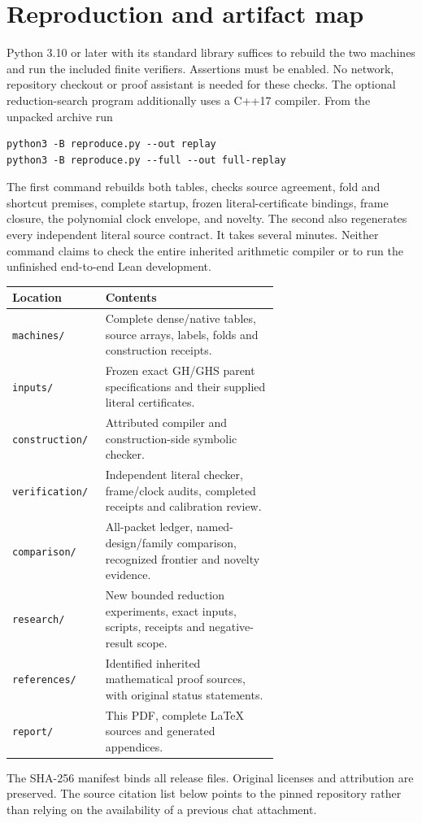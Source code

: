 \documentclass[11pt,letterpaper]{article}
\newcommand{\file}[1]{\nolinkurl{#1}}
\begin{document}
\section{Reproduction and artifact map}
Python 3.10 or later with its standard library suffices to rebuild the two
machines and run the included finite verifiers. Assertions must be enabled.
No network, repository checkout or proof assistant is needed for these
checks. The optional reduction-search program additionally uses a C++17
compiler. From the unpacked archive run
\begin{verbatim}
python3 -B reproduce.py --out replay
python3 -B reproduce.py --full --out full-replay
\end{verbatim}
The first command rebuilds both tables, checks source agreement, fold and
shortcut premises, complete startup, frozen literal-certificate bindings,
frame closure, the polynomial clock envelope, and novelty. The second also
regenerates every independent literal source contract. It takes several
minutes. Neither command claims to check the entire inherited arithmetic
compiler or to run the unfinished end-to-end Lean development.

\begin{center}\small
\begin{tabular}{lp{0.65\linewidth}}
\toprule
Location & Contents\\
\midrule
\file{machines/} & Complete dense/native tables, source arrays, labels, folds and construction receipts.\\
\file{inputs/} & Frozen exact GH/GHS parent specifications and their supplied literal certificates.\\
\file{construction/} & Attributed compiler and construction-side symbolic checker.\\
\file{verification/} & Independent literal checker, frame/clock audits, completed receipts and calibration review.\\
\file{comparison/} & All-packet ledger, named-design/family comparison, recognized frontier and novelty evidence.\\
\file{research/} & New bounded reduction experiments, exact inputs, scripts, receipts and negative-result scope.\\
\file{references/} & Identified inherited mathematical proof sources, with original status statements.\\
\file{report/} & This PDF, complete LaTeX sources and generated appendices.\\
\bottomrule
\end{tabular}
\end{center}
The SHA-256 manifest binds all release files. Original licenses and
attribution are preserved. The source citation list below points to the
pinned repository rather than relying on the availability of a previous
chat attachment.
\end{document}
